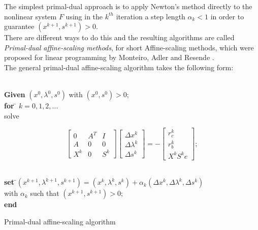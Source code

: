 \documentclass[a4paper,10 pt,titlepage,twoside]{book}
\theoremstyle{plain}
\theoremstyle{definition}
\theoremstyle{remark}
\begin{document}
The simplest primal-dual approach is to apply Newton's method directly to the nonlinear system $F$ using in the $k^{th}$ iteration a step length $\alpha_{k}<1$ in order to guarantee $(x^{k+1},s^{k+1})>0$.\\ There are different ways to do this and the resulting algorithms are called \textit{Primal-dual affine-scaling methods}, for short Affine-scaling methods, which were proposed for linear programming by Monteiro,
Adler and Resende \cite{MARE}.\\ 
 The general primal-dual affine-scaling algorithm takes the following form:\\
\begin{algorithm}[H]
\begin{tabbing}
	\\
	\textbf{Given} $(x^{0}, \lambda^{0}, s^{0})$ with $(x^{0}, s^{0})>0$;\\
	\textbf{for} \= $k = 0, 1, 2,...$ \\
	\> solve
	\end{tabbing}
\begin{equation}\label{mtx:aff}\tag{4.2b}	
\begin{bmatrix}
0&A^{T}&I \\A& 0&0\\X^{k}&0&S^{k}
\end{bmatrix}\begin{bmatrix}
\Delta x^{k}\\\Delta\lambda^{k} \\\Delta s^{k}
\end{bmatrix}=-\begin{bmatrix}
r_{c}^{k}\\r_{b}^{k}\\X^{k}S^{k}e
\end{bmatrix};
\end{equation}
\begin{tabbing}
	\\
	\=\textbf{set} \=$(x^{k+1}, \lambda^{k+1}, s^{k+1}) = (x^{k}, \lambda^{k}, s^{k})+ \alpha_{k}(\Delta x^{k}, \Delta\lambda^{k}, \Delta s^{k})$
	\\
	\>\> with $\alpha_{k}$ such that $(x^{k+1}, s^{k+1})>0$; \\
	\textbf{end}
\end{tabbing}
\caption{\label{alg:AS}Primal-dual affine-scaling algorithm}
\end{algorithm}
\end{document}
